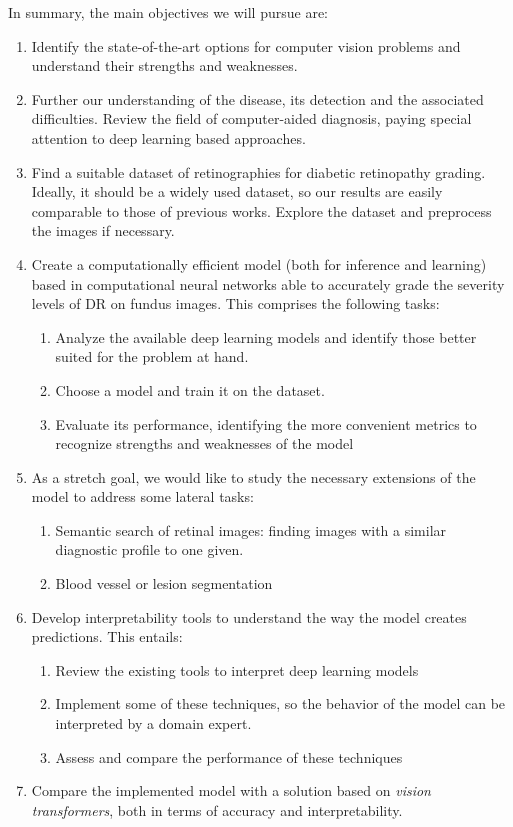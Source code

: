 In summary, the main objectives we will pursue are:
\begin{enumerate}[label=(O\arabic*)]
    \item Identify the state-of-the-art options for computer vision problems and understand their strengths and weaknesses. 
    \item Further our understanding of the disease, its detection and the associated difficulties. Review the field of computer-aided diagnosis, paying special attention to deep learning based approaches.
    \item Find a suitable dataset of retinographies for diabetic retinopathy grading. Ideally, it should be a widely used dataset, so our results are easily comparable to those of previous works. Explore the dataset and preprocess the images if necessary. \label{preprocess}
    \item Create a computationally efficient model (both for inference and learning) based in computational neural networks able to accurately grade the severity levels of DR on fundus images. This comprises the following tasks: \label{firstObj}
    \begin{enumerate}[label=(O\arabic{enumi}.\arabic*)]
        \item Analyze the available deep learning models and identify those better suited for the problem at hand.\label{deepModels}
        \item Choose a model and train it on the dataset. \label{modelChosen}
        \item Evaluate its performance, identifying the more convenient metrics to recognize strengths and weaknesses of the model
    \end{enumerate}
    \item As a stretch goal, we would like to study the necessary extensions of the model to address some lateral tasks: \label{extModel}
    \begin{enumerate}[label=(O\arabic{enumi}.\arabic*)]
        \item Semantic search of retinal images: finding images with a similar diagnostic profile to one given.
        \item Blood vessel or lesion segmentation
    \end{enumerate}
    \item Develop interpretability tools to understand the way the model creates predictions. This entails:
    \begin{enumerate}[label=(O\arabic{enumi}.\arabic*)]
        \item Review the existing tools to interpret deep learning models
        \item Implement some of these techniques, so the behavior of the model can be interpreted by a domain expert.
        \item Assess and compare the performance of these techniques
    \end{enumerate}
    \item Compare the implemented model with a solution based on \textit{vision transformers}, both in terms of accuracy and interpretability. \label{vitvsCNN}
\end{enumerate}

